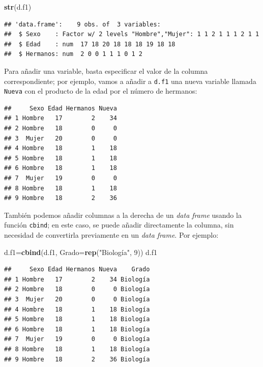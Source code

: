 \documentclass[]{book}
\newenvironment{Shaded}{\begin{snugshade}}{\end{snugshade}}
\newcommand{\DataTypeTok}[1]{\textcolor[rgb]{0.13,0.29,0.53}{#1}}
\newcommand{\DecValTok}[1]{\textcolor[rgb]{0.00,0.00,0.81}{#1}}
\newcommand{\KeywordTok}[1]{\textcolor[rgb]{0.13,0.29,0.53}{\textbf{#1}}}
\newcommand{\NormalTok}[1]{#1}
\newcommand{\OperatorTok}[1]{\textcolor[rgb]{0.81,0.36,0.00}{\textbf{#1}}}
\newcommand{\StringTok}[1]{\textcolor[rgb]{0.31,0.60,0.02}{#1}}
\theoremstyle{definition}
\theoremstyle{definition}
\theoremstyle{definition}
\theoremstyle{remark}
\begin{document}
\begin{Shaded}
\begin{Highlighting}[]
\KeywordTok{str}\NormalTok{(d.f1)}
\end{Highlighting}
\end{Shaded}

\begin{verbatim}
## 'data.frame':    9 obs. of  3 variables:
##  $ Sexo    : Factor w/ 2 levels "Hombre","Mujer": 1 1 2 1 1 1 2 1 1
##  $ Edad    : num  17 18 20 18 18 18 19 18 18
##  $ Hermanos: num  2 0 0 1 1 1 0 1 2
\end{verbatim}

Para añadir una variable, basta especificar el valor de la columna correspondiente; por ejemplo, vamos a añadir a \texttt{d.f1} una nueva variable llamada \texttt{Nueva} con el producto de la edad por el número de hermanos:

\begin{Shaded}
\end{Shaded}

\begin{verbatim}
##     Sexo Edad Hermanos Nueva
## 1 Hombre   17        2    34
## 2 Hombre   18        0     0
## 3  Mujer   20        0     0
## 4 Hombre   18        1    18
## 5 Hombre   18        1    18
## 6 Hombre   18        1    18
## 7  Mujer   19        0     0
## 8 Hombre   18        1    18
## 9 Hombre   18        2    36
\end{verbatim}

También podemos añadir columnas a la derecha de un \emph{data frame} usando la función \texttt{cbind}; en este caso, se puede añadir directamente la columna, sin necesidad de convertirla previamente en un \emph{data frame}. Por ejemplo:

\begin{Shaded}
\begin{Highlighting}[]
\NormalTok{d.f1=}\KeywordTok{cbind}\NormalTok{(d.f1, }\DataTypeTok{Grado=}\KeywordTok{rep}\NormalTok{(}\StringTok{"Biología"}\NormalTok{, }\DecValTok{9}\NormalTok{))}
\NormalTok{d.f1}
\end{Highlighting}
\end{Shaded}

\begin{verbatim}
##     Sexo Edad Hermanos Nueva    Grado
## 1 Hombre   17        2    34 Biología
## 2 Hombre   18        0     0 Biología
## 3  Mujer   20        0     0 Biología
## 4 Hombre   18        1    18 Biología
## 5 Hombre   18        1    18 Biología
## 6 Hombre   18        1    18 Biología
## 7  Mujer   19        0     0 Biología
## 8 Hombre   18        1    18 Biología
## 9 Hombre   18        2    36 Biología
\end{verbatim}
\end{document}
